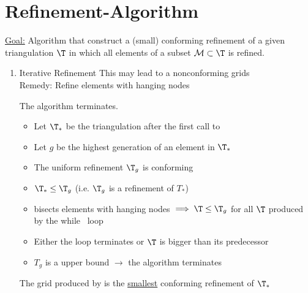 \section{Refinement-Algorithm}
\underline{Goal:} Algorithm that construct a (small) conforming refinement of a given triangulation $\T$ in which all elements of a subset $\mathcal{M} \subset \T$ is refined.
\begin{enumerate}[label = \alph*)]
	\item Iterative Refinement\nl
        \nl
		This may lead to a nonconforming grids\\
		Remedy: Refine elements with hanging nodes\nl
        \nl
		\begin{lemma}
			The algorithm terminates.
			\begin{itemize}
              \item Let $\T_{*}$ be the triangulation after the first call to 
				\item Let $g$ be the highest generation of an element in $\T_{*}$ 
				\item The uniform refinement $\T_{g}$ is conforming
				\item $\T_{*}\leq \T_{g}$ (i.e. $\T_{g}$ is a refinement of $T_{*}$)
                \item {}
					bisects elements with hanging nodes $\implies \T \leq \T_{g}$ for all $\T$ produced by the \glqq while \grqq\ loop
				\item Either the loop terminates or $\T$ is bigger than its predecessor
				\item $T_{g}$ is a upper bound $\to$ the algorithm terminates
			\end{itemize}
		\end{lemma}
		\begin{lemma}
			The grid produced by \code{REFINE}
			is the \underline{smallest} conforming refinement of $\T_{*}$
		\end{lemma}

\end{enumerate}
